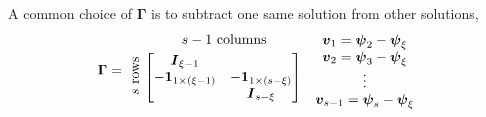 \documentclass{overview}
\begin{document}
A common choice of $\boldsymbol{\Gamma}$ is to subtract one same solution from other solutions,
\[
	\boldsymbol{\Gamma} =
	\begin{array}{lc}
		& s-1 \text{ columns} \vspace{3pt} \\
		\rotatebox{90}{\hspace{-10pt}$s$ rows}\hspace{-10pt}
 &\!\begin{bmatrix}
	 \I_{\xi-1} & \\
	 -\boldsymbol{1}_{1\times (\xi-1)} & -\boldsymbol{1}_{1\times (s-\xi)} \\
	 & \I_{s-\xi} \\
 \end{bmatrix}
 \vspace{5pt}
	\end{array}
	\begin{array}{c}
		\boldsymbol{v}_1 = \boldsymbol{\psi}_2 - \boldsymbol{\psi}_\xi \\
		\boldsymbol{v}_2 = \boldsymbol{\psi}_3 - \boldsymbol{\psi}_\xi \\
		\vdots \\
		\boldsymbol{v}_{s-1} = \boldsymbol{\psi}_{s} - \boldsymbol{\psi}_\xi \\
	\end{array}
\]
\end{document}
